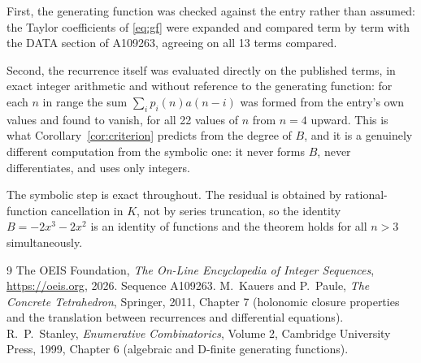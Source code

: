 \documentclass[11pt,a4paper]{article}
\theoremstyle{plain}
\theoremstyle{definition}
\begin{document}
First, the generating function was checked against the entry rather than assumed: the
Taylor coefficients of \eqref{eq:gf} were expanded and compared term by term with the DATA
section of A109263, agreeing on all 13 terms compared.

Second, the recurrence itself was evaluated directly on the published terms, in exact
integer arithmetic and without reference to the generating function: for each $n$ in range
the sum $\sum_{i}p_{i}(n)a(n-i)$ was formed from the entry's own values and found to
vanish, for all 22 values of $n$ from $n=4$ upward. This is what
Corollary~\ref{cor:criterion} predicts from the degree of $B$, and it is a genuinely
different computation from the symbolic one: it never forms $B$, never differentiates, and
uses only integers.

The symbolic step is exact throughout. The residual is obtained by rational-function
cancellation in $K$, not by series truncation, so the identity $B=- 2 x^{3} - 2 x^{2}$ is an
identity of functions and the theorem holds for all $n>3$ simultaneously.

\begin{thebibliography}{9}
 The OEIS Foundation, \emph{The On-Line Encyclopedia of Integer Sequences},
\url{https://oeis.org}, 2026. Sequence A109263.
 M.~Kauers and P.~Paule, \emph{The Concrete Tetrahedron}, Springer, 2011,
Chapter 7 (holonomic closure properties and the translation between recurrences and
differential equations).
 R.~P.~Stanley, \emph{Enumerative Combinatorics}, Volume 2, Cambridge
University Press, 1999, Chapter 6 (algebraic and D-finite generating functions).
\end{thebibliography}
\end{document}
